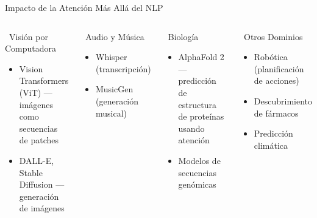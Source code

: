 \documentclass[aspectratio=169]{beamer}
\begin{document}
\begin{frame}{Impacto de la Atención Más Allá del NLP}
    \begin{columns}[t]
        \begin{block}{\faEye\ Visión por Computadora}
            \begin{itemize}
                \item Vision Transformers (ViT) --- imágenes como secuencias de patches
                \item DALL-E, Stable Diffusion --- generación de imágenes
            \end{itemize}
        \end{block}
        
        \begin{block}{\faMusic\ Audio y Música}
            \begin{itemize}
                \item Whisper (transcripción)
                \item MusicGen (generación musical)
            \end{itemize}
        \end{block}
        
        \begin{block}{\faDna\ Biología}
            \begin{itemize}
                \item AlphaFold 2 --- predicción de estructura de proteínas usando atención
                \item Modelos de secuencias genómicas
            \end{itemize}
        \end{block}
        
        \begin{block}{\faGamepad\ Otros Dominios}
            \begin{itemize}
                \item Robótica (planificación de acciones)
                \item Descubrimiento de fármacos
                \item Predicción climática
            \end{itemize}
        \end{block}
    \end{columns}
\end{frame}

\end{document}
